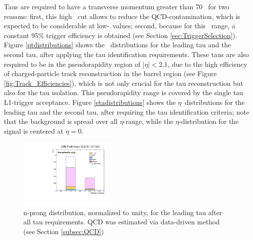 \noindent Taus are required to have a transverse momentum greater than 70 \GeV~for two reasons:
first, this high \pt~cut allows to reduce the QCD-contamination, which is expected 
to be considerable at low-\pt~values; second, because for this \pt~range, a 
constant 95$\%$ trigger efficiency is 
obtained (see Section \ref{sec:TriggerSelection}). Figure \ref{ptdistributions}
shows the \pt~distributions for the leading tau and the second tau,
after applying the tau identification requirements. These taus are also required 
to be in the pseudorapidity region of $|\eta| < 2.1$, due to the high efficiency 
of charged-particle track reconstruction in the barrel 
region (see Figure \ref{fig:Track_Efficiencies}), which is not only crucial 
for the tau reconstruction but also for the tau isolation. This pseudorapidity
range is covered by the single tau L1-trigger acceptance. Figure \ref{etadistributions} shows the 
$\eta$~distributions for the leading tau and the second tau, after requiring the tau identification criteria;
note that the background is spread over all $\eta$-range, while the $\eta$-distribution for the signal 
is centered at $\eta = 0$.\\

\begin{figure}[H]
 \begin{center}
 \captionsetup[subfloat]{farskip=0pt,captionskip=0.0cm,labelformat=empty}
 \includegraphics[clip,width=0.43\textwidth]{figuras/Chapter5/TauID_Plots/nTracks.pdf}
 \end{center}
 \caption{n-prong distribution, normalized to unity, for the leading tau after all tau requirements. QCD was estimated via data-driven method (see Section \ref{subsec:QCD})}
 \label{ntracks}
 \end{figure}

